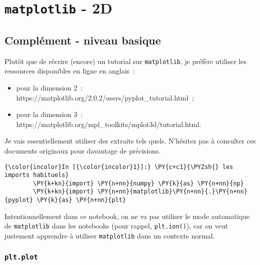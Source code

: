     
    
    
    

    

    \hypertarget{matplotlib---2d}{%
\section{\texorpdfstring{\texttt{matplotlib} -
2D}{matplotlib - 2D}}\label{matplotlib---2d}}

    \hypertarget{compluxe9ment---niveau-basique}{%
\subsection{Complément - niveau
basique}\label{compluxe9ment---niveau-basique}}

    Plutôt que de récrire (encore) un tutorial sur \texttt{matplotlib}, je
préfère utiliser les ressources disponibles en ligne en anglais~:

\begin{itemize}
\tightlist
\item
  pour la dimension 2~:
  https://matplotlib.org/2.0.2/users/pyplot\_tutorial.html~;
\item
  pour la dimension 3~:
  https://matplotlib.org/mpl\_toolkits/mplot3d/tutorial.html.
\end{itemize}

Je vais essentiellement utiliser des extraits tels quels. N'hésitez pas
à consulter ces documents originaux pour davantage de précisions.

    \begin{Verbatim}[commandchars=\\\{\},frame=single,framerule=0.3mm,rulecolor=\color{cellframecolor}]
{\color{incolor}In [{\color{incolor}1}]:} \PY{c+c1}{\PYZsh{} les imports habituels}
        \PY{k+kn}{import} \PY{n+nn}{numpy} \PY{k}{as} \PY{n+nn}{np}
        \PY{k+kn}{import} \PY{n+nn}{matplotlib}\PY{n+nn}{.}\PY{n+nn}{pyplot} \PY{k}{as} \PY{n+nn}{plt}
\end{Verbatim}


    Intentionnellement dans ce notebook, on ne va pas utiliser le mode
automatique de \texttt{matplotlib} dans les notebooks (pour rappel,
\texttt{plt.ion()}), car on veut justement apprendre à utiliser
\texttt{matplotlib} dans un contexte normal.

    \hypertarget{plt.plot}{%
\subsubsection{\texorpdfstring{\texttt{plt.plot}}{plt.plot}}\label{plt.plot}}


